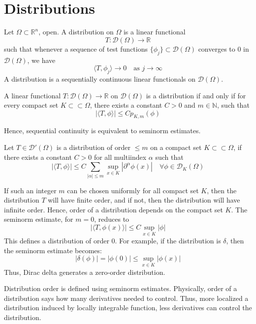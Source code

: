\section{Distributions}
\begin{definition}
    Let $\Omega\subset \mathbb{R}^n$, open. A distribution on $\Omega$ is a linear functional
    \[
    T:\mathcal{D}(\Omega)\to\mathbb{R}
    \]
    such that whenever a sequence of test functions $\{\phi_j\}\subset\mathcal{D}(\Omega)$ converges to 0 in $\mathcal{D}(\Omega)$, we have
    \[
    \langle T, \phi_j\rangle\to 0 \quad \text{as } j\to\infty
    \]
    A distribution is a sequentially continuous linear functionals on $\mathcal{D}(\Omega)$. 
\end{definition}
\begin{theorem}
  A linear functional $T:\mathcal{D}(\Omega)\to \mathbb{R}$ on $\mathcal{D}(\Omega)$ is a distribution if and only if for every compact set $K\subset\subset\Omega$, there exists a constant $C>0$ and $m\in\mathbb{N}$, such that
  \[
  |\langle T,\phi\rangle|\le Cp_{K,m}(\phi)
  \] 
\end{theorem}
Hence, sequential continuity is equivalent to seminorm estimates.
\begin{definition}
    Let $T\in\mathcal{D}'(\Omega)$ is a distribution of order $\le m$ on a compact set $K\subset\subset\Omega$, if there exists a constant $C>0$ for all multiindex $\alpha$ such that
    \[
    |\langle T, \phi\rangle|\le C\sum_{|\alpha|\le m}\sup_{x\in K}|\partial^\alpha\phi(x)|\quad \forall \phi\in \mathcal{D}_K(\Omega)
    \]
\end{definition}
If such an integer $m$ can be chosen uniformly for all compact set $K$, then the distribution $T$ will have finite order, and if not, then the distribution will have infinite order. Hence, order of a distribution depends on the compact set $K$. The seminorm estimate, for $m=0$, reduces to 
\[
|\langle T,\phi(x)\rangle|\le C\sup_{x\in K}|\phi|
\]
This defines a distribution of order 0. For example, if the distribution is $\delta$, then the seminorm estimate becomes:
\[
|\delta(\phi)|=|\phi(0)|\le\sup_{x\in K}|\phi(x)|
\]
Thus, Dirac delta generates a zero-order distribution. 
\begin{remark}
    Distribution order is defined using seminorm estimates. Physically, order of a distribution says how many derivatives needed to control. Thus, more localized a distribution induced by locally integrable function, less derivatives can control the distribution. 
\end{remark}
